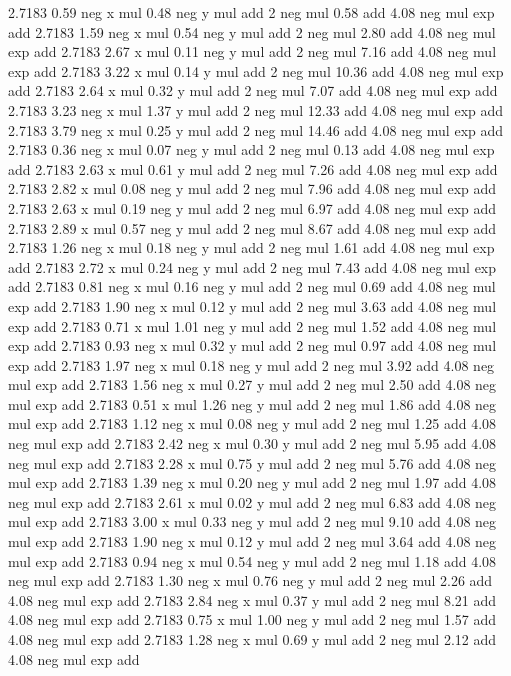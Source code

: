 2.7183 0.59 neg x mul 0.48 neg y mul add 2 neg mul 0.58 add 4.08 neg mul exp add %
2.7183 1.59 neg x mul 0.54 neg y mul add 2 neg mul 2.80 add 4.08 neg mul exp add %
2.7183 2.67 x mul 0.11 neg y mul add 2 neg mul 7.16 add 4.08 neg mul exp add %
2.7183 3.22 x mul 0.14 y mul add 2 neg mul 10.36 add 4.08 neg mul exp add %
2.7183 2.64 x mul 0.32 y mul add 2 neg mul 7.07 add 4.08 neg mul exp add %
2.7183 3.23 neg x mul 1.37 y mul add 2 neg mul 12.33 add 4.08 neg mul exp add %
2.7183 3.79 neg x mul 0.25 y mul add 2 neg mul 14.46 add 4.08 neg mul exp add %
2.7183 0.36 neg x mul 0.07 neg y mul add 2 neg mul 0.13 add 4.08 neg mul exp add %
2.7183 2.63 x mul 0.61 y mul add 2 neg mul 7.26 add 4.08 neg mul exp add %
2.7183 2.82 x mul 0.08 neg y mul add 2 neg mul 7.96 add 4.08 neg mul exp add %
2.7183 2.63 x mul 0.19 neg y mul add 2 neg mul 6.97 add 4.08 neg mul exp add %
2.7183 2.89 x mul 0.57 neg y mul add 2 neg mul 8.67 add 4.08 neg mul exp add %
2.7183 1.26 neg x mul 0.18 neg y mul add 2 neg mul 1.61 add 4.08 neg mul exp add %
2.7183 2.72 x mul 0.24 neg y mul add 2 neg mul 7.43 add 4.08 neg mul exp add %
2.7183 0.81 neg x mul 0.16 neg y mul add 2 neg mul 0.69 add 4.08 neg mul exp add %
2.7183 1.90 neg x mul 0.12 y mul add 2 neg mul 3.63 add 4.08 neg mul exp add %
2.7183 0.71 x mul 1.01 neg y mul add 2 neg mul 1.52 add 4.08 neg mul exp add %
2.7183 0.93 neg x mul 0.32 y mul add 2 neg mul 0.97 add 4.08 neg mul exp add %
2.7183 1.97 neg x mul 0.18 neg y mul add 2 neg mul 3.92 add 4.08 neg mul exp add %
2.7183 1.56 neg x mul 0.27 y mul add 2 neg mul 2.50 add 4.08 neg mul exp add %
2.7183 0.51 x mul 1.26 neg y mul add 2 neg mul 1.86 add 4.08 neg mul exp add %
2.7183 1.12 neg x mul 0.08 neg y mul add 2 neg mul 1.25 add 4.08 neg mul exp add %
2.7183 2.42 neg x mul 0.30 y mul add 2 neg mul 5.95 add 4.08 neg mul exp add %
2.7183 2.28 x mul 0.75 y mul add 2 neg mul 5.76 add 4.08 neg mul exp add %
2.7183 1.39 neg x mul 0.20 neg y mul add 2 neg mul 1.97 add 4.08 neg mul exp add %
2.7183 2.61 x mul 0.02 y mul add 2 neg mul 6.83 add 4.08 neg mul exp add %
2.7183 3.00 x mul 0.33 neg y mul add 2 neg mul 9.10 add 4.08 neg mul exp add %
2.7183 1.90 neg x mul 0.12 y mul add 2 neg mul 3.64 add 4.08 neg mul exp add %
2.7183 0.94 neg x mul 0.54 neg y mul add 2 neg mul 1.18 add 4.08 neg mul exp add %
2.7183 1.30 neg x mul 0.76 neg y mul add 2 neg mul 2.26 add 4.08 neg mul exp add %
2.7183 2.84 neg x mul 0.37 y mul add 2 neg mul 8.21 add 4.08 neg mul exp add %
2.7183 0.75 x mul 1.00 neg y mul add 2 neg mul 1.57 add 4.08 neg mul exp add %
2.7183 1.28 neg x mul 0.69 y mul add 2 neg mul 2.12 add 4.08 neg mul exp add %
